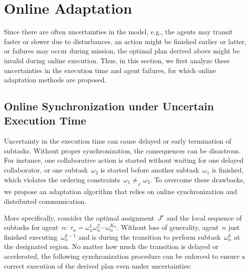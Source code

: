 \section{Online Adaptation}
\label{subsec:online-adaptation}

Since there are often uncertainties in the model, e.g., the agents may
transit faster or slower due to disturbances,
an action might be finished earlier or latter,
or failures may occur during mission,
the optimal plan derived above might be invalid during online execution.
Thus, in this section, we first analyze these uncertainties in the execution time
and agent failures, for which online adaptation methods are proposed.

\subsection{Online Synchronization under Uncertain Execution Time}\label{subsubsec:uncertain}
Uncertainty in the execution time can cause delayed or early termination of subtasks.
Without proper synchronization, the consequences can be disastrous.
For instance, one collaborative action is started without waiting for one
delayed collaborator, or one subtask~$\omega_2$ is started before another
subtask~$\omega_1$ is finished, which violates the ordering constraints~$\omega_1\neq_{\varphi} \omega_2$.
To overcome these drawbacks, we propose an adaptation algorithm
that relies on {online synchronization} and distributed communication.

More specifically, consider the optimal assignment~$J^\star$ and the local
sequence of subtasks for agent~$n$: $\tau_n=\omega^1_n\omega^2_n\cdots \omega^{K_n}_n$.
Without loss of generality, agent~$n$ just finished executing~$\omega^{k-1}_n$ and
is during the transition to perform subtask~$\omega^k_n$ at the designated region.
No matter how much the transition is delayed or accelerated,
the following synchronization procedure can be enforced to
ensure a correct execution of the derived plan even under uncertainties:

